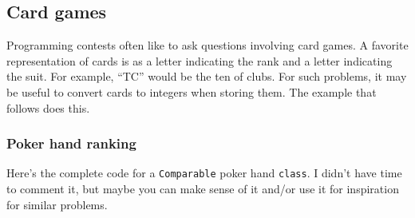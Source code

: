 \documentclass[a4paper,12pt]{article}
\begin{document}
\subsection{Card games}
Programming contests often like to ask questions involving card games. A favorite representation of cards is as a letter indicating the rank and a letter indicating the suit. For example, ``TC'' would be the ten of clubs. For such problems, it may be useful to convert cards to integers when storing them. The example that follows does this.

\subsubsection{Poker hand ranking}
\noindent Here's the complete code for a \lstinline/Comparable/ poker hand \lstinline/class/. I didn't have time to comment it, but maybe you can make sense of it and/or use it for inspiration for similar problems.
\end{document}
